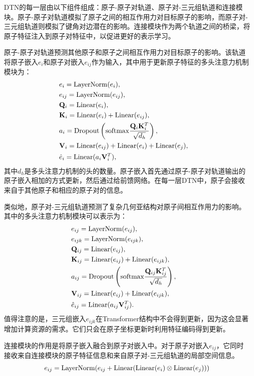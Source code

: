 DTN的每一层由以下组件组成：原子-原子对轨道、原子对-三元组轨道和连接模块。原子-原子对轨道模拟了原子之间的相互作用力对目标原子的影响，而原子对-三元组轨道则模拟了键角对边潜在的影响。连接模块作为两个轨道之间的桥梁，将原子特征注入到原子对特征中，以促进更好的表示学习。

原子-原子对轨道预测其他原子和原子之间相互作用力对目标原子的影响。该轨道将原子嵌入$e_i$和原子对嵌入$e_{ij}$作为输入，其中用于更新原子特征的多头注意力机制模块为：
\begin{eqnarray}
    &e_i = {\rm LayerNorm}(e_i),& \\
    &e_{ij} = {\rm LayerNorm}(e_{ij}),& \\
    &\mathbf{Q}_i = {\rm Linear}(e_i),& \\ 
    &\mathbf{K}_i = {\rm Linear}(e_i) + {\rm Linear}(e_{ij}),& \\
    &a_i = {\rm Dropout} \left({\rm softmax} \frac{\mathbf{Q}_i \mathbf{K}_i^T}{\sqrt{d_h}} \right), & \\
    &\mathbf{V}_i = {\rm Linear}(e_{ij}) + {\rm Linear}(e_{i}) + {\rm Linear}(e_{j}),& \\
    &\hat{e}_i = {\rm Linear}(a_i \mathbf{V}_i^T),&
\end{eqnarray}
其中$d_h$是多头注意力机制的头的数量。原子嵌入首先通过原子-原子对轨道输出的原子嵌入相加的方式更新，然后通过给前馈网络。在每一层DTN中，原子会接收来自于其他原子和相应的原子对的信息。

类似地，原子对-三元组轨道预测了复杂几何亚结构对原子间相互作用力的影响。其中的多头注意力机制模块可以表示为：
\begin{eqnarray}
    &e_{ij} = {\rm LayerNorm}(e_{ij}),&\\
    &e_{ijk} = {\rm LayerNorm}(e_{ijk}),&\\
    &\mathbf{Q}_{ij} = {\rm Linear}(e_{ij}),& \\ 
    &\mathbf{K}_{ij} = {\rm Linear}(e_{ij}) + {\rm Linear}(e_{ijk}),& \\
    &a_{ij}= {\rm Dropout} \left({\rm softmax} \frac{\mathbf{Q}_{ij} \mathbf{K}_{ij}^T}{\sqrt{d_h}} \right), & \\
    &\mathbf{V}_{ij} = {\rm Linear}(e_{ij}) + {\rm Linear}(e_{ijk}),& \\
    &\hat{e}_{ij} = {\rm Linear}(a_{ij} \mathbf{V}_{ij}^T).&
\end{eqnarray}
值得注意的是，三元组嵌入$e_{ijk}$在Transformer结构中不会得到更新，因为这会显著增加计算资源的需求。它们只会在原子坐标更新时利用特征编码得到更新。

连接模块的作用是将原子嵌入融合到原子对嵌入中。对于原子对嵌入$e_{ij}$，它同时接收来自连接模块的原子特征信息和来自原子对-三元组轨道的局部空间信息。
\begin{equation}
    e_{ij} = {\rm LayerNorm}(e_{ij} + {\rm Linear}({\rm Linear}(e_i) \otimes {\rm Linear}(e_j)))
\end{equation}


